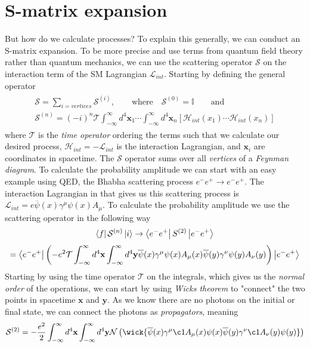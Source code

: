 \documentclass[12pt, a4paper]{book}
\begin{document}
\section{S-matrix expansion}
But how do we calculate processes? To explain this generally, we can conduct an S-matrix expansion. To be more precise and use terms from quantum field theory rather than quantum mechanics, we can use the scattering operator $\mathcal{S}$ on the interaction 
term of the SM Lagrangian $\mathcal{L}_{int}$. Starting by defining the general operator
\begin{align}\label{eq:S-matrix}
    \begin{split}
        \mathcal{S} = \sum_{i = vertices}\mathcal{S}^{(i)},\qquad\text{where}\quad \mathcal{S}^{(0)} = \mathbb{I}\qquad\text{and}\quad \\
        \mathcal{S}^{(n)}=(-i)^n\mathcal{T}\int_{-\infty}^{\infty}d^4\mathbf{x}_1\cdots\int_{-\infty}^{\infty}d^4\mathbf{x}_n\left[\mathcal{H}_{int}(x_1)\cdots\mathcal{H}_{int}(x_n)\right]
    \end{split}
\end{align}
where $\mathcal{T}$ is the \textit{time operator} ordering the terms such that we calculate our desired process, $\mathcal{H}_{int}=-\mathcal{L}_{int}$ is the interaction Lagrangian, and $\mathbf{x}_i$ are coordinates in spacetime.  The $\mathcal{S}$ operator sums over all \textit{vertices} 
of a \textit{Feynman diagram}. To calculate the probability amplitude we can start with an easy example using QED, the Bhabha scattering process $e^- e^+\rightarrow e^-e^+$. The interaction Lagrangian in that gives us this scattering process is 
$\mathcal{L}_{int} = e\overline{\psi}(x)\gamma^\mu\psi(x)A_\mu$. To calculate the probability amplitude we use the scattering operator in the following way
$$
\bra{f}\mathcal{S}^{(n)}\ket{i} \rightarrow \bra{e^-e^+}S^{(2)}\ket{e^-e^+} 
$$
$$
= \bra{e^-e^+}\left(-e^2\mathcal{T}\int_{-\infty}^{\infty}d^4\mathbf{x} \int_{-\infty}^{\infty}d^4\mathbf{y} \overline{\psi}(x)\gamma^\mu\psi(x)A_\mu(x)\overline{\psi}(y)\gamma^\nu\psi(y)A_\nu(y) \right)\ket{e^-e^+}
$$
Starting by using the time operator $\mathcal{T}$ on the integrals, which gives us the \textit{normal order} of the operations, we can start by using \textit{Wicks theorem} to "connect" the two points in spacetime $\mathbf{x}$ and $\mathbf{y}$. As we know there are no photons on the initial or final state, we can connect the photons as \textit{propagators}, meaning
$$
\mathcal{S}^{(2)} = -\frac{e^2}{2}\int_{-\infty}^{\infty}d^4\mathbf{x} \int_{-\infty}^{\infty}d^4\mathbf{y} \mathcal{N} \left(\wick{\overline{\psi}(x)\gamma^\mu\c1A_\mu(x)\psi(x)\overline{\psi}(y)\gamma^\nu\c1A_\nu(y)\psi(y)}\right)
$$
\end{document}
